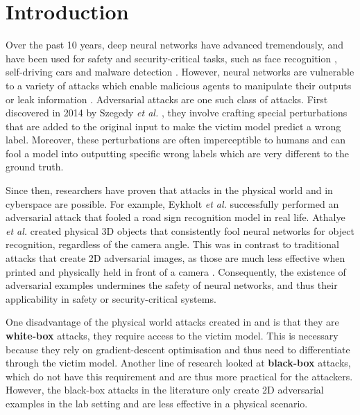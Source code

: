 \chapter{Introduction}
	\label{chap:intro}

Over the past 10 years, deep neural networks have advanced tremendously, and have been used for safety and security-critical tasks, such as face recognition \cite{face_recognition}, self-driving cars \cite{self_driving_cars} and malware detection \cite{malware_detection}. However, neural networks are vulnerable to a variety of attacks which enable malicious agents to manipulate their outputs or leak information \cite{deep_leakage, trojan_attacks, poisoning_attacks, szegedy2014intriguing}. Adversarial attacks are one such class of attacks. First discovered in 2014 by Szegedy \textit{et al.} \cite{szegedy2014intriguing}, they involve crafting special perturbations that are added to the original input to make the victim model predict a wrong label. Moreover, these perturbations are often imperceptible to humans \cite{szegedy2014intriguing} and can fool a model into outputting specific wrong labels which are very different to the ground truth.

Since then, researchers have proven that attacks in the physical world \cite{evtimov_road_signs} and in cyberspace \cite{papernot_cyberspace_attack} are possible. For example, Eykholt \textit{et al.} \cite{evtimov_road_signs} successfully performed an adversarial attack that fooled a road sign recognition model in real life. Athalye \textit{et al.} \cite{athalye} created physical 3D objects that consistently fool neural networks for object recognition, regardless of the camera angle. This was in contrast to traditional attacks that create 2D adversarial images, as those are much less effective when printed and physically held in front of a camera \cite{lu_physical_experiments}. Consequently, the existence of adversarial examples undermines the safety of neural networks, and thus their applicability in safety or security-critical systems.

One disadvantage of the physical world attacks created in \cite{athalye} and \cite{evtimov_road_signs} is that they are \textbf{white-box} attacks, they require access to the victim model. This is necessary because they rely on gradient-descent optimisation and thus need to differentiate through the victim model. Another line of research looked at \textbf{black-box} attacks, which do not have this requirement \cite{akhtar} and are thus more practical for the attackers. However, the black-box attacks in the literature only create 2D adversarial examples in the lab setting and are less effective in a physical scenario.

